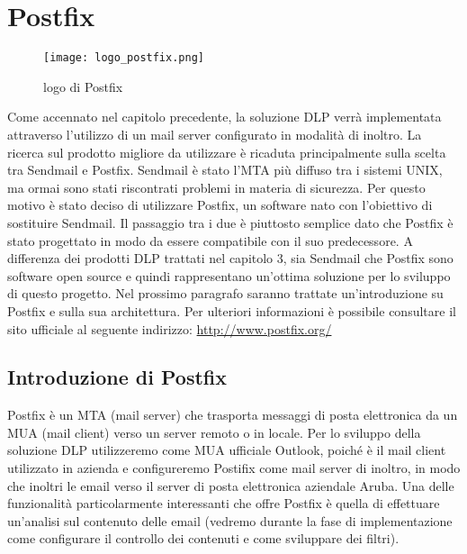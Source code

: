 \chapter{Postfix}

\begin{figure}[htp]
    \centering
    \texttt{[image: logo\_postfix.png]}
        \caption{logo di Postfix}\label{logoPostfix}
  \end{figure}
  
  Come accennato nel capitolo precedente, la soluzione DLP verrà implementata attraverso l'utilizzo di un 
  mail server configurato in modalità di inoltro.
  La ricerca sul prodotto migliore da utilizzare è ricaduta principalmente sulla scelta tra Sendmail e Postfix. 
  Sendmail è stato l'MTA più diffuso tra i sistemi UNIX, ma ormai sono stati riscontrati problemi in materia
  di sicurezza. 
  Per questo motivo è stato deciso di utilizzare Postfix, un software nato con l'obiettivo di sostituire Sendmail. Il passaggio
  tra i due è piuttosto semplice dato che Postfix è stato progettato in modo da essere compatibile con il 
  suo predecessore.
  A differenza dei prodotti DLP trattati nel capitolo 3, sia Sendmail che Postfix sono software open source e
  quindi rappresentano un'ottima soluzione per lo sviluppo di questo progetto.
  Nel prossimo paragrafo saranno trattate un'introduzione su Postfix e sulla sua architettura. Per ulteriori
  informazioni è possibile consultare il sito ufficiale al seguente indirizzo: \url{http://www.postfix.org/}
   
  \pagebreak
  \section{Introduzione di Postfix}
  Postfix è un MTA (mail server) che trasporta messaggi di posta elettronica da un MUA (mail client) verso un server remoto o in locale. Per lo sviluppo della soluzione DLP utilizzeremo come MUA ufficiale Outlook, poiché è il mail client utilizzato in azienda e configureremo Postifix come mail server di inoltro, in modo che inoltri le email verso il server di posta elettronica aziendale Aruba. Una delle funzionalità particolarmente interessanti che offre Postfix è quella di effettuare un’analisi sul contenuto delle email (vedremo durante la fase di implementazione come configurare il controllo dei contenuti e come sviluppare dei filtri).
  
